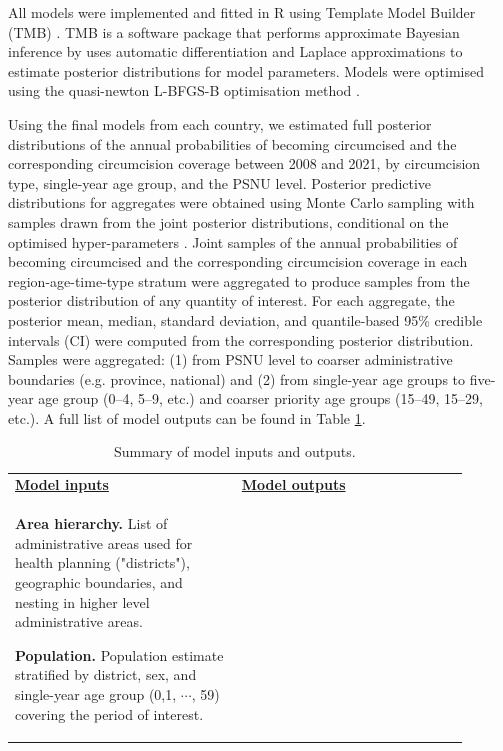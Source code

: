 \documentclass{article}
\begin{document}
\begin{appendix}
All models were implemented and fitted in R \cite{rcore} using Template Model Builder (TMB) \cite{kristensen2016tmb}. TMB is a software package that performs approximate Bayesian inference by uses automatic differentiation and Laplace approximations to estimate posterior distributions for model parameters. Models were optimised using the {\color{red}quasi-newton L-BFGS-B} optimisation method \cite{byrd1995limited}.

Using the final models from each country, we estimated full posterior distributions of the annual probabilities of becoming circumcised and the corresponding circumcision coverage {\color{red}between 2008 and 2021}, by circumcision type, single-year age group, and the PSNU level. Posterior predictive distributions for aggregates were obtained using Monte Carlo sampling with samples drawn from the joint posterior distributions, conditional on the optimised hyper-parameters \cite{eaton2021naomi}. Joint samples of the annual probabilities of becoming circumcised and the corresponding circumcision coverage in each region-age-time-type stratum were aggregated to produce samples from the posterior distribution of any quantity of interest. For each aggregate, the posterior mean, median, standard deviation, and quantile-based 95\% credible intervals (CI) were computed from the corresponding posterior distribution. Samples were aggregated: (1) from PSNU level to coarser administrative boundaries (e.g. province, national) and (2) from single-year age groups to five-year age group (0--4, 5--9, etc.) and coarser priority age groups (15--49, 15--29, etc.). A full list of model outputs can be found in Table \ref{tab::inputsoutputs}.

{\linespread{1} 
\begin{table}[H]
	\small
	\centering	
	\caption{Summary of model inputs and outputs.}
    \label{tab::inputsoutputs}
	\begin{tabular}{| p{0.45\linewidth} | p{0.45\linewidth} |}
		\hline

			\textbf{\underline{Model inputs}} & \textbf{\underline{Model outputs}} \\
			
			{\bf Area hierarchy.} List of administrative areas used for health planning ("districts"), geographic boundaries, and nesting in higher level administrative areas.
			\vspace{5pt}
			
			{\bf Population.} Population estimate stratified by district, sex, and single-year age group (0,1, $\cdots$, 59) covering the period of interest. 
			\vspace{5pt}
			

\end{tabular}
\end{table}}
\end{appendix}
\end{document}

